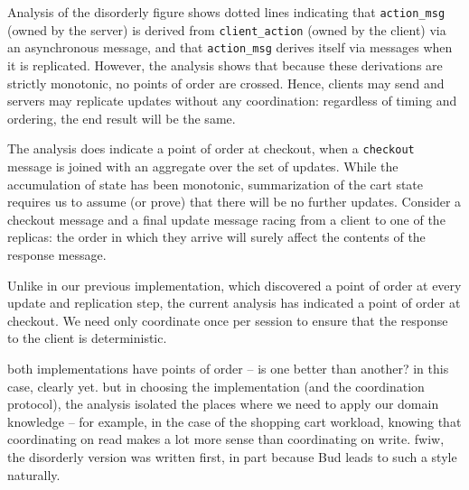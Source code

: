 Analysis of the disorderly figure shows dotted lines indicating that 
\texttt{action\_msg} (owned by the server) is derived from \texttt{client\_action} 
(owned by the client) via an asynchronous message, and that \texttt{action\_msg} 
derives itself via messages when it is replicated.  However, the analysis
shows that because these derivations are strictly monotonic, no points of
order are crossed.  Hence, clients may send and servers may replicate 
updates without any coordination: regardless of timing and ordering, the end
result will be the same.

The analysis does indicate a point of order at checkout, when a \texttt{checkout}
message is joined with an aggregate over the set of updates.  While the 
accumulation of state has been monotonic, summarization of the cart state
requires us to assume (or prove) that there will be no further updates.
Consider a checkout message and a final update message racing from a client
to one of the replicas: the order in which they arrive will surely affect
the contents of the response message.  

Unlike in our previous implementation, which discovered a point of order at
every update and replication step, the current analysis has indicated
a point of order at checkout.  We need only coordinate once per session to
ensure that the response to the client is deterministic.


both implementations have points of order -- is one better than another?
in this case, clearly yet.  but in choosing the implementation (and the coordination
protocol), the analysis isolated the places where we need to apply our domain knowledge 
-- for example, in the case of the shopping cart workload, knowing that coordinating
on read makes a lot more sense than coordinating on write.
fwiw, the disorderly version was written first, in part because Bud leads to such a style
naturally.

